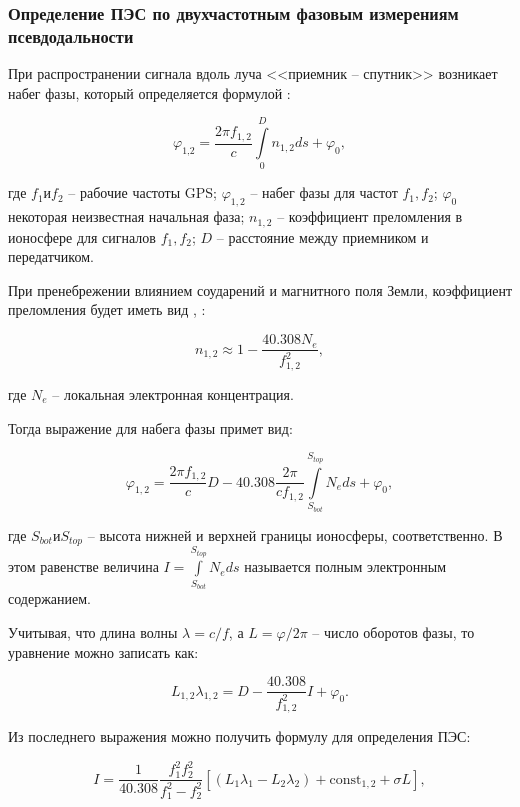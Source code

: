 \documentclass[a4paper]{article}
\begin{document}
\subsubsection{Определение ПЭС по двухчастотным фазовым измерениям псевдодальности}
При распространении сигнала вдоль луча <<приемник -- спутник>> возникает набег фазы, который определяется формулой \cite{devis}:

\begin{equation}
\varphi_\text{1,2} = \frac{2\pi f_{1,2}}{c} \int\limits_{0}^{D}n_{1,2}ds + \varphi_0,
\end{equation}

где $f_1 \text{и}  f_2$ -- рабочие частоты GPS; $\varphi_{1,2}$ -- набег фазы для частот $f_1, f_2$; $\varphi_0$ некоторая неизвестная начальная фаза; $n_{1,2}$ -- коэффициент преломления в ионосфере для сигналов $f_1, f_2$; $D$ -- расстояние между приемником и передатчиком.

При пренебрежении влиянием соударений и магнитного поля Земли, коэффициент преломления будет иметь вид \cite{devis}, \cite{ratcliff}:

\begin{equation}
\label{n_equ}
n_{1,2} \approx 1 - \frac{40.308N_e}{f_{1,2}^2},
\end{equation}

где $N_e$ -- локальная электронная концентрация.

Тогда выражение для набега фазы примет вид:

\begin{equation}
\varphi_{1,2} = \frac{2\pi f_{1,2}}{c}D - 40.308\frac{2\pi}{c f_{1,2}}\int\limits_{S_{bot}}^{S_{top}}N_e ds + \varphi_0,
\end{equation}

где $S_{bot} \text{и} S_{top}$ -- высота нижней и верхней границы ионосферы, соответственно. В этом равенстве величина $I = \int\limits_{S_{bot}}^{S_{top}}N_eds$ называется полным электронным содержанием.

Учитывая, что длина волны $\lambda = c / f$, а $L = \varphi / 2\pi$ -- число оборотов фазы, то уравнение можно записать как:

\begin{equation}
L_{1,2} \lambda_{1,2} = D - \frac{40.308}{f_{1,2}^2}I + \varphi_0.
\end{equation}

Из последнего выражения можно получить формулу для определения ПЭС:

\begin{equation}
\label{tecF}
I = \frac{1}{40.308}\frac{f_1^2 f_2^2}{f_1^2 - f_2^2} \left[ \left( L_1\lambda_1 - L_2\lambda_2 \right) + \text{const}_{1,2} + \sigma L \right],
\end{equation}
\end{document}
